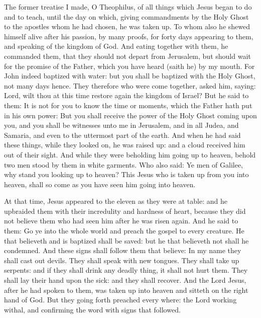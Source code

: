 The former treatise I made, O Theophilus, of all things which Jesus began to do
and to teach, until the day on which, giving commandments by the Holy Ghost to
the apostles whom he had chosen, he was taken up.  To whom also he shewed
himself alive after his passion, by many proofs, for forty days appearing to
them, and speaking of the kingdom of God.  And eating together with them, he
commanded them, that they should not depart from Jerusalem, but should wait for
the promise of the Father, which you have heard (saith he) by my mouth.  For
John indeed baptized with water: but you shall be baptized with the Holy Ghost,
not many days hence.  They therefore who were come together, asked him, saying:
Lord, wilt thou at this time restore again the kingdom of Israel?  But he said
to them: It is not for you to know the time or moments, which the Father hath
put in his own power: But you shall receive the power of the Holy Ghost coming
upon you, and you shall be witnesses unto me in Jerusalem, and in all Judea,
and Samaria, and even to the uttermost part of the earth.  And when he had said
these things, while they looked on, he was raised up: and a cloud received him
out of their sight.  And while they were beholding him going up to heaven,
behold two men stood by them in white garments.  Who also said: Ye men of
Galilee, why stand you looking up to heaven? This Jesus who is taken up from
you into heaven, shall so come as you have seen him going into heaven.

\bigskip



At that time, Jesus appeared to the eleven as they were at table: and he upbraided
them with their incredulity and hardness of heart, because they did not believe
them who had seen him after he was risen again.  And he said to them: Go ye
into the whole world and preach the gospel to every creature.  He that
believeth and is baptized shall be saved: but he that believeth not shall he
condemned.  And these signs shall follow them that believe: In my name they
shall cast out devils. They shall speak with new tongues.  They shall take up
serpents: and if they shall drink any deadly thing, it shall not hurt them.
They shall lay their hand upon the sick: and they shall recover.  And the Lord
Jesus, after he had spoken to them, was taken up into heaven and sitteth on the
right hand of God.  But they going forth preached every where: the Lord working
withal, and confirming the word with signs that followed.


